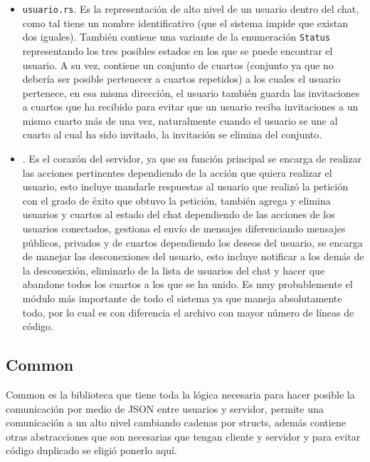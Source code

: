 \documentclass[12pt]{article}
\begin{document}
\begin{itemize}
\item \texttt{usuario.rs}. Es la representación de alto nivel de un usuario dentro del chat, como tal tiene un nombre identificativo (que el sistema impide que existan dos iguales). También contiene una variante de la enumeración \texttt{Status} representando los tres posibles estados en los que se puede encontrar el usuario. A su vez, contiene un conjunto de cuartos (conjunto ya que no debería ser posible pertenecer a cuartos repetidos) a los cuales el usuario pertenece, en esa misma dirección, el usuario también guarda las invitaciones a cuartos que ha recibido para evitar que un usuario reciba invitaciones a un mismo cuarto más de una vez, naturalmente cuando el usuario se une al cuarto al cual ha sido invitado, la invitación se elimina del conjunto.

  \item \texttt{}. Es el corazón del servidor, ya que su función principal \texttt{} se encarga de realizar las acciones pertinentes dependiendo de la acción que quiera realizar el usuario, esto incluye mandarle respuestas al usuario que realizó la petición con el grado de éxito que obtuvo la petición, también agrega y elimina usuarios y cuartos al estado del chat dependiendo de las acciones de los usuarios conectados, gestiona el envío de mensajes diferenciando mensajes públicos, privados y de cuartos dependiendo los deseos del usuario, se encarga de manejar las desconexiones del usuario, esto incluye notificar a los demás de la desconexión, eliminarlo de la lista de usuarios del chat y hacer que abandone todos los cuartos a los que se ha unido. Es muy probablemente el módulo más importante de todo el sistema ya que maneja absolutamente todo, por lo cual es con diferencia el archivo con mayor número de líneas de código.
  
\end{itemize}

\subsection{Common}

Common es la biblioteca que tiene toda la lógica necesaria para hacer posible la comunicación por medio de JSON entre usuarios y servidor, permite una comunicación a un alto nivel cambiando cadenas por structs, además contiene otras abstracciones que son necesarias que tengan cliente y servidor y para evitar código duplicado se eligió ponerlo aquí.
\end{document}

